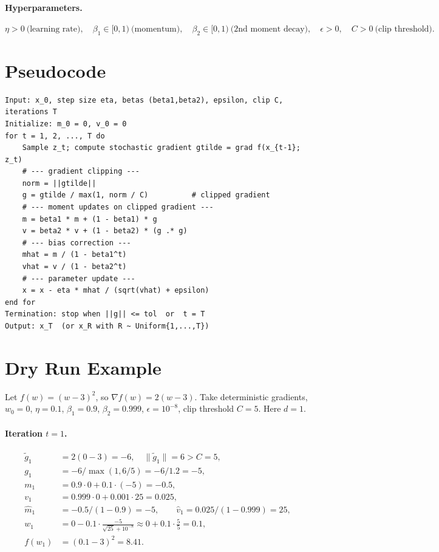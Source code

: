 \documentclass[11pt]{article}
\begin{document}
\paragraph{Hyperparameters.}
\[
\eta>0\ \text{(learning rate)},\quad
\beta_1\in[0,1)\ \text{(momentum)},\quad
\beta_2\in[0,1)\ \text{(2nd moment decay)},\quad
\epsilon>0,\quad
C>0\ \text{(clip threshold)}.
\]

\section*{Pseudocode}

\begin{verbatim}
Input: x_0, step size eta, betas (beta1,beta2), epsilon, clip C, iterations T
Initialize: m_0 = 0, v_0 = 0
for t = 1, 2, ..., T do
    Sample z_t; compute stochastic gradient gtilde = grad f(x_{t-1}; z_t)
    # --- gradient clipping ---
    norm = ||gtilde||
    g = gtilde / max(1, norm / C)          # clipped gradient
    # --- moment updates on clipped gradient ---
    m = beta1 * m + (1 - beta1) * g
    v = beta2 * v + (1 - beta2) * (g .* g)
    # --- bias correction ---
    mhat = m / (1 - beta1^t)
    vhat = v / (1 - beta2^t)
    # --- parameter update ---
    x = x - eta * mhat / (sqrt(vhat) + epsilon)
end for
Termination: stop when ||g|| <= tol  or  t = T
Output: x_T  (or x_R with R ~ Uniform{1,...,T})
\end{verbatim}

\section*{Dry Run Example}

Let $f(w) = (w-3)^2$, so $\nabla f(w) = 2(w-3)$. Take deterministic gradients,
$w_0=0$, $\eta=0.1$, $\beta_1=0.9$, $\beta_2=0.999$, $\epsilon=10^{-8}$,
clip threshold $C=5$. Here $d=1$.

\paragraph{Iteration $t=1$.}
\begin{align*}
\widetilde g_1 &= 2(0-3) = -6, \quad \|\widetilde g_1\| = 6 > C=5,\\
g_1 &= -6 / \max(1, 6/5) = -6/1.2 = -5,\\
m_1 &= 0.9\cdot 0 + 0.1\cdot(-5) = -0.5,\\
v_1 &= 0.999\cdot 0 + 0.001\cdot 25 = 0.025,\\
\hat m_1 &= -0.5/(1-0.9) = -5,\qquad
\hat v_1 = 0.025/(1-0.999) = 25,\\
w_1 &= 0 - 0.1\cdot \frac{-5}{\sqrt{25}+10^{-8}} 
       \approx 0 + 0.1\cdot\frac{5}{5} = 0.1,\\
f(w_1) &= (0.1-3)^2 = 8.41.
\end{align*}
\end{document}
